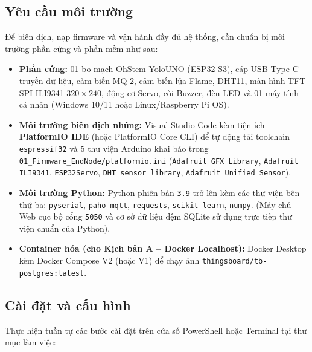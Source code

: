 \subsection{Yêu cầu môi trường}
\label{subsec:yeu-cau-moi-truong}

Để biên dịch, nạp firmware và vận hành đầy đủ hệ thống, cần chuẩn bị môi trường phần cứng và phần mềm như sau:
\begin{itemize}[leftmargin=*, itemsep=2pt]
  \item \textbf{Phần cứng:} 01 bo mạch OhStem YoloUNO (ESP32-S3), cáp USB Type-C truyền dữ liệu, cảm biến MQ-2, cảm biến lửa Flame, DHT11, màn hình TFT SPI ILI9341 $320 \times 240$, động cơ Servo, còi Buzzer, đèn LED và 01 máy tính cá nhân (Windows 10/11 hoặc Linux/Raspberry Pi OS).
  \item \textbf{Môi trường biên dịch nhúng:} Visual Studio Code kèm tiện ích \textbf{PlatformIO IDE} (hoặc PlatformIO Core CLI) để tự động tải toolchain \texttt{espressif32} và 5 thư viện Arduino khai báo trong \texttt{01\_Firmware\_EndNode/platformio.ini} (\texttt{Adafruit GFX Library}, \texttt{Adafruit ILI9341}, \texttt{ESP32Servo}, \texttt{DHT sensor library}, \texttt{Adafruit Unified Sensor}).
  \item \textbf{Môi trường Python:} Python phiên bản \texttt{3.9} trở lên kèm các thư viện bên thứ ba: \texttt{pyserial}, \texttt{paho-mqtt}, \texttt{requests}, \texttt{scikit-learn}, \texttt{numpy}. (Máy chủ Web cục bộ cổng \texttt{5050} và cơ sở dữ liệu đệm SQLite sử dụng trực tiếp thư viện chuẩn của Python).
  \item \textbf{Container hóa (cho Kịch bản A -- Docker Localhost):} Docker Desktop kèm Docker Compose V2 (hoặc V1) để chạy ảnh \texttt{thingsboard/tb-postgres:latest}.
\end{itemize}

\subsection{Cài đặt và cấu hình}
\label{subsec:cai-dat-cau-hinh}

Thực hiện tuần tự các bước cài đặt trên cửa sổ PowerShell hoặc Terminal tại thư mục làm việc:

